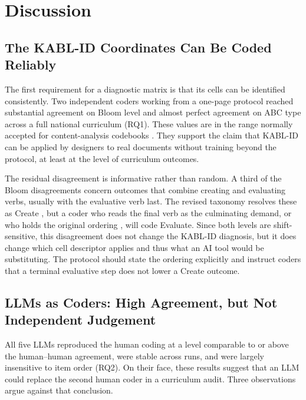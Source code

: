 \documentclass[journal,article,submit,pdftex,moreauthors]{Definitions/mdpi}
\begin{document}
\section{Discussion}
\label{sec:discussion}

\subsection{The KABL-ID Coordinates Can Be Coded Reliably}

The first requirement for a diagnostic matrix is that its cells can be identified consistently. Two independent coders working from a one-page protocol reached substantial agreement on Bloom level and almost perfect agreement on ABC type across a full national curriculum (RQ1). These values are in the range normally accepted for content-analysis codebooks \cite{krippendorff_2018, landis_koch_1977}. They support the claim that KABL-ID can be applied by designers to real documents without training beyond the protocol, at least at the level of curriculum outcomes.

The residual disagreement is informative rather than random. A third of the Bloom disagreements concern outcomes that combine creating and evaluating verbs, usually with the evaluative verb last. The revised taxonomy resolves these as Create \cite{anderson_krathwohl_2001, krathwohl_2002}, but a coder who reads the final verb as the culminating demand, or who holds the original ordering \cite{bloom_1956}, will code Evaluate. Since both levels are shift-sensitive, this disagreement does not change the KABL-ID diagnosis, but it does change which cell descriptor applies and thus what an AI tool would be substituting. The protocol should state the ordering explicitly and instruct coders that a terminal evaluative step does not lower a Create outcome.

\subsection{LLMs as Coders: High Agreement, but Not Independent Judgement}

All five LLMs reproduced the human coding at a level comparable to or above the human--human agreement, were stable across runs, and were largely insensitive to item order (RQ2). On their face, these results suggest that an LLM could replace the second human coder in a curriculum audit. Three observations argue against that conclusion.
\end{document}
